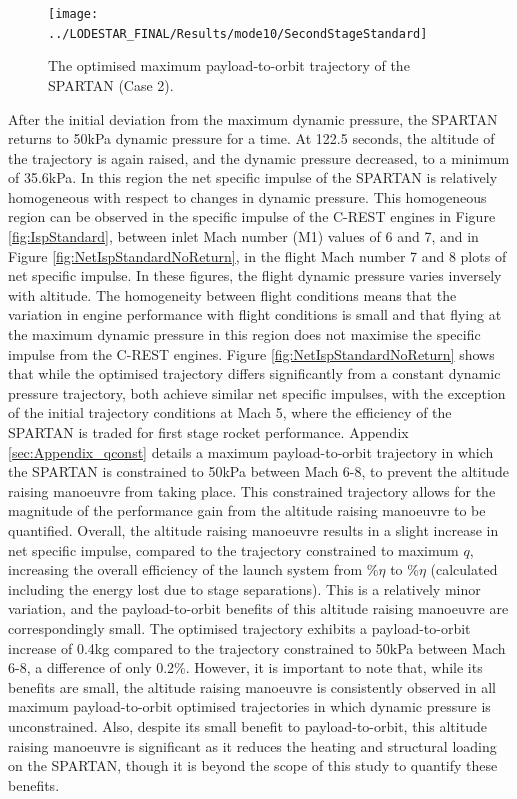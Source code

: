\begin{figure}[ht!]
\centering
\texttt{[image: ../LODESTAR\_FINAL/Results/mode10/SecondStageStandard]}
\caption{The optimised maximum payload-to-orbit trajectory of the SPARTAN (Case 2).}
\label{fig:SecondStageStandardNoReturn}
\end{figure}



After the initial deviation from the maximum dynamic pressure, the SPARTAN returns to 50kPa dynamic pressure for a time. 
At 122.5 seconds, the altitude of the trajectory is again raised, and the dynamic pressure decreased, to a minimum of 35.6kPa. In this region the net specific impulse of the SPARTAN is relatively homogeneous with respect to changes in dynamic pressure. This homogeneous region can be observed in the specific impulse of the C-REST engines in Figure \ref{fig:IspStandard}, between inlet Mach number (M1) values of 6 and 7, and in Figure \ref{fig:NetIspStandardNoReturn}, in the flight Mach number 7 and 8 plots of net specific impulse. In these figures, the flight dynamic pressure varies inversely with altitude. The homogeneity between flight conditions means that the variation in engine performance with flight conditions is small and that flying at the maximum dynamic pressure in this region does not maximise the specific impulse from the C-REST engines. Figure \ref{fig:NetIspStandardNoReturn} shows that while the optimised trajectory differs significantly from a constant dynamic pressure trajectory, both achieve similar net specific impulses, with the exception of the initial trajectory conditions at Mach 5, where the efficiency of the SPARTAN is traded for first stage rocket performance. 
Appendix \ref{sec:Appendix_qconst} details a maximum payload-to-orbit trajectory in which the SPARTAN is constrained to 50kPa between Mach 6-8, to prevent the altitude raising manoeuvre from taking place. This constrained trajectory allows for the magnitude of the performance gain from the altitude raising manoeuvre to be quantified. 
Overall, the altitude raising manoeuvre results in a slight increase in net specific impulse, compared to the trajectory constrained to maximum $q$, increasing the overall efficiency of the launch system from \totalExergyEffqconstrainedNoReturn \%$\eta$ to \totalExergyEffStandardNoReturn\%$\eta$ (calculated including the energy lost due to stage separations). This is a relatively minor variation, and the payload-to-orbit benefits of this altitude raising manoeuvre are correspondingly small. 
The optimised trajectory exhibits a payload-to-orbit increase of 0.4kg compared to the trajectory constrained to 50kPa between Mach 6-8, a difference of only 0.2\%.
However, it is important to note that, while its benefits are small, the altitude raising manoeuvre is consistently observed in all maximum payload-to-orbit optimised trajectories in which dynamic pressure is unconstrained. 
Also, despite its small benefit to payload-to-orbit, this altitude raising manoeuvre is significant as it reduces the heating and structural loading on the SPARTAN, though it is beyond the scope of this study to quantify these benefits. 




